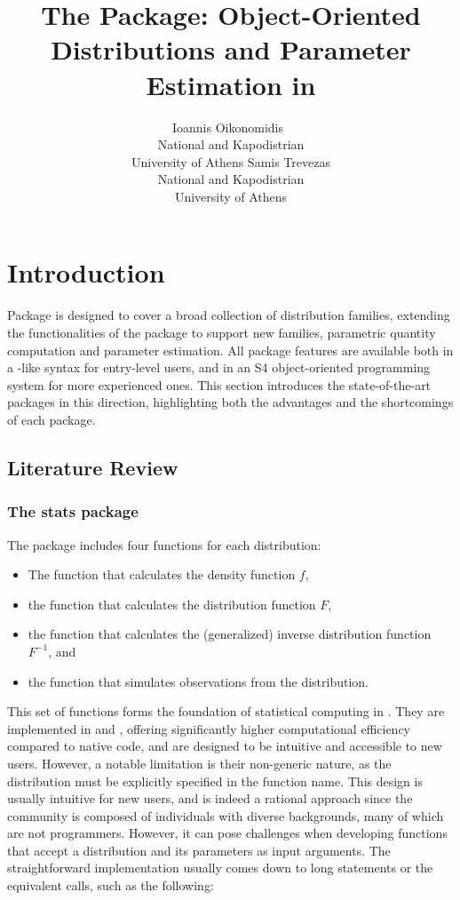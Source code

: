\documentclass[nojss]{jss}
\author{Ioannis Oikonomidis~\orcidlink{0000-0001-8130-2104}\\National and Kapodistrian \\ University of Athens
  \And Samis Trevezas\\National and Kapodistrian \\ University of Athens}
\title{The \pkg{xbar} Package: Object-Oriented Distributions and Parameter Estimation in \proglang{R}}
\newcommand{\fct}[1]{\code{#1()}}
\begin{document}
\section[Introduction]{Introduction} \label{s:intro}

Package  is designed to cover a broad collection of distribution families, extending the functionalities of the  package to support new families, parametric quantity computation and parameter estimation. All package features are available both in a -like syntax for entry-level users, and in an S4 object-oriented programming system for more experienced ones. This section introduces the state-of-the-art  packages in this direction, highlighting both the advantages and the shortcomings of each package.

\subsection[Literature Review]{Literature Review}\label{ss:review}

\subsubsection[The stats package]{The stats package}\label{ss:stats}

The  package includes four functions for each distribution:
\begin{itemize}
  \item The \fct{d<name>} function that calculates the density function $f$,
  \item the \fct{p<name>} function that calculates the distribution function $F$,
  \item the \fct{q<name>} function that calculates the (generalized) inverse distribution function $F^{-1}$, and
  \item the \fct{r<name>} function that simulates observations from the distribution.
\end{itemize}

This set of functions forms the foundation of statistical computing in . They are implemented in  and , offering significantly higher computational efficiency compared to native  code, and are designed to be intuitive and accessible to new users. However, a notable limitation is their non-generic nature, as the distribution must be explicitly specified in the function name. This design is usually intuitive for new users, and is indeed a rational approach since the   community is composed of individuals with diverse backgrounds, many of which are not programmers. However, it can pose challenges when developing functions that accept a distribution and its parameters as input arguments. The straightforward implementation usually comes down to long  statements or the equivalent \fct{switch} calls, such as the following:
\end{document}

